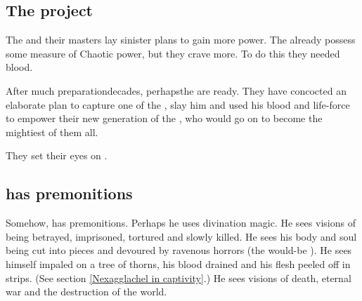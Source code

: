 








\subsection{The \Sathariah project}
The \resphain{} and their \bane{} masters lay sinister plans to gain more power. The \resphain{} already possess some measure of Chaotic power, but they crave more. To do this they needed \draconic{} blood. 

After much preparation\dash decades, perhaps\dash the \resphain{} are ready. They have concocted an elaborate plan to capture one of the \dragonlords{}, slay him and used his blood and life-force to empower their new generation of \resphain\dash the , who would go on to become the mightiest of them all. 

They set their eyes on \Ishnaruchaefir.







\subsection{\Ishnaruchaefir has premonitions}
Somehow, \Ishnaruchaefir{} has premonitions. 
Perhaps he uses divination magic. 
He sees visions of being betrayed, imprisoned, tortured and slowly killed. 
He sees his body and soul being cut into pieces and devoured by ravenous horrors (the would-be \satharioth). 
He sees himself impaled on a tree of thorns, his blood drained and his flesh peeled off in strips. (See section \ref{Nexagglachel in captivity}.) 
He sees visions of death, eternal war and the destruction of the world. 

